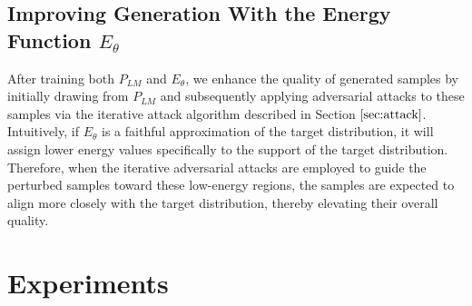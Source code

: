 \documentclass{article}
\begin{document}
\subsection{Improving Generation With the Energy Function \(E_\theta\)}



After training both \(P_{LM}\) and \(E_\theta\), we enhance the quality of generated samples by initially drawing from \(P_{LM}\) and subsequently applying adversarial attacks to these samples via the iterative attack algorithm described in Section \(\ref{sec:attack}\).  Intuitively, if \(E_\theta\) is a faithful approximation of the target distribution, it will assign lower energy values specifically to the support of the target distribution. Therefore, when the iterative adversarial attacks are employed to guide the perturbed samples toward these low-energy regions, the samples are expected to align more closely with the target distribution, thereby elevating their overall quality.



  


\newpage
\section{Experiments}
\end{document}
